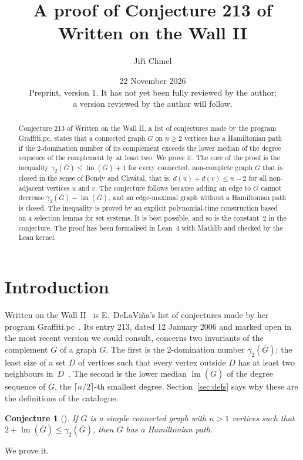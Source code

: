 \documentclass[11pt,a4paper]{article}
\title{A proof of Conjecture 213 of Written on the Wall II}
\author{Ji\v{r}\'{\i} Chmel}
\date{22 November 2026\\[1ex]
\small Preprint, version 1. It has not yet been fully reviewed by the author;\\
a version reviewed by the author will follow.}
\newtheorem{conjecture}{Conjecture}
\theoremstyle{remark}
\newcommand{\lm}{\operatorname{lm}}
\newcommand{\Gc}{\overline{G}}
\newcommand{\ceil}[1]{\lceil #1\rceil}
\begin{document}
\maketitle

\begin{abstract}
Conjecture 213 of Written on the Wall II, a list of conjectures made by the program Graffiti.pc,
states that a connected graph $G$ on $n\ge 2$ vertices has a Hamiltonian path if the
2-domination number of its complement exceeds the lower median of the degree sequence of the
complement by at least two. We prove it. The core of the proof is the inequality
$\gamma_2(\Gc)\le\lm(\Gc)+1$ for every connected, non-complete graph $G$ that is closed in the
sense of Bondy and Chv\'atal, that is, $d(u)+d(v)\le n-2$ for all non-adjacent vertices $u$ and
$v$. The conjecture follows because adding an edge to $G$ cannot decrease
$\gamma_2(\Gc)-\lm(\Gc)$, and an edge-maximal graph without a Hamiltonian path is closed. The
inequality is proved by an explicit polynomial-time construction based on a selection lemma for
set systems. It is best possible, and so is the constant~2 in the conjecture. The proof has been
formalised in Lean~4 with Mathlib and checked by the Lean kernel.
\end{abstract}

\section{Introduction}

Written on the Wall II~\cite{wowii} is E.~DeLaVi\~na's list of conjectures made by her program
Graffiti.pc~\cite{gpc}. Its entry 213, dated 12 January 2006 and marked open in the most recent version we could consult, concerns
two invariants of the complement $\Gc$ of a graph $G$. The first is the 2-domination number
$\gamma_2(\Gc)$: the least size of a set $D$ of vertices such that every vertex outside $D$ has
at least two neighbours in~$D$~\cite{fj,dlpw}. The second is the lower median $\lm(\Gc)$ of the
degree sequence of $\Gc$, the $\ceil{n/2}$-th smallest degree. Section~\ref{sec:defs} says why
these are the definitions of the catalogue.

\begin{conjecture}[\cite{wowii}]
If $G$ is a simple connected graph with $n>1$ vertices such that
$2+\lm(\Gc)\le\gamma_2(\Gc)$, then $G$ has a Hamiltonian path.
\end{conjecture}

We prove it.
\end{document}
